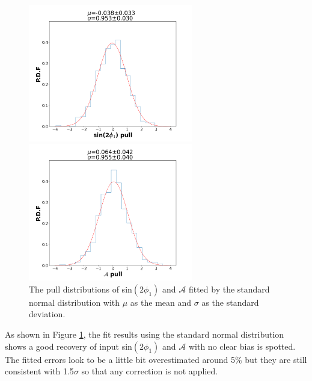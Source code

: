 \begin{figure}[htpb]
	\begin{minipage}{0.5\linewidth}
		\includegraphics[height=6cm]{figures/pull_hist_S}
	\end{minipage}
	\begin{minipage}{0.5\linewidth}
		\includegraphics[height=6cm]{figures/pull_hist_A}
	\end{minipage}
	\caption{The pull distributions of sin$(2\phi_1)$ and $\mathcal{A}$ fitted by the standard normal distribution with $\mu$ as the mean and $\sigma$ as the standard deviation. }\label{fig:pull}
\end{figure}

As shown in Figure \ref{fig:pull}, the fit results using the standard normal distribution shows a good recovery of input sin$(2\phi_1)$ and $\mathcal{A}$ with no clear bias is spotted. The fitted errors look to be a little bit overestimated around 5\% but they are still consistent with 1.5$\sigma$ so that any correction is not applied.



